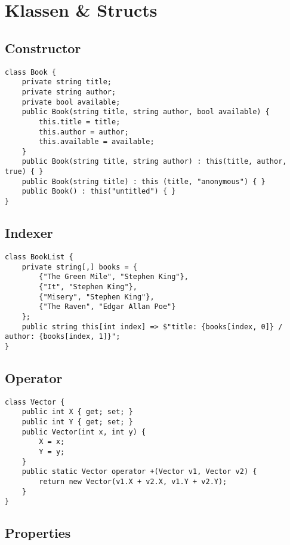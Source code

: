 \section{Klassen \& Structs}
\subsection{Constructor}
\begin{lstlisting}
class Book {
	private string title;
	private string author;
	private bool available;	
	public Book(string title, string author, bool available) {
		this.title = title;
		this.author = author;
		this.available = available;
    }
	public Book(string title, string author) : this(title, author, true) { }
	public Book(string title) : this (title, "anonymous") { }
	public Book() : this("untitled") { }
}
\end{lstlisting}

\subsection{Indexer}
\begin{lstlisting}
class BookList {
	private string[,] books = {
		{"The Green Mile", "Stephen King"},
		{"It", "Stephen King"},
		{"Misery", "Stephen King"},
		{"The Raven", "Edgar Allan Poe"}
	};
	public string this[int index] => $"title: {books[index, 0]} / author: {books[index, 1]}";
}
\end{lstlisting}

\subsection{Operator}
\begin{lstlisting}
class Vector {
	public int X { get; set; }
	public int Y { get; set; }
	public Vector(int x, int y) {
		X = x;
		Y = y;
	}
	public static Vector operator +(Vector v1, Vector v2) {
		return new Vector(v1.X + v2.X, v1.Y + v2.Y);
	}
}
\end{lstlisting}

\subsection{Properties}

